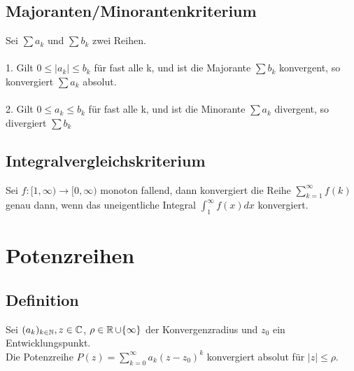 \documentclass[german]{latex4ei/latex4ei_sheet}
\begin{document}
\begin{sectionbox}
	\subsection{Majoranten/Minorantenkriterium}
	Sei $\sum a_k$  und $\sum b_k$ zwei Reihen.\\
	\\1. Gilt $0 \le |a_k| \le b_k$ für fast alle k, und ist die Majorante $\sum  b_k$ konvergent, so konvergiert $\sum  a_k$ absolut. \\
    \\2. Gilt $0 \le a_k \le b_k$ für fast alle k, und ist die Minorante $\sum  a_k$ divergent, so divergiert $\sum  b_k$


\end{sectionbox}
\begin{sectionbox}
	\subsection{Integralvergleichskriterium}

	Sei $f:[1, \infty) \rightarrow [0,\infty)$ monoton fallend, dann konvergiert die Reihe $\sum \limits_{k=1}^{\infty} f(k)$ genau dann, wenn das uneigentliche Integral $\int_{1}^{\infty}f(x)dx$ konvergiert.
\end{sectionbox}


\section{Potenzreihen}

\begin{sectionbox}
	\subsection{Definition}
	Sei $(a_k)_{k \in \operatorname{\mathbb N}},z \in \mathbb C$,  $\rho \in \operatorname{\mathbb R} \cup \{\infty\} $ der Konvergenzradius und $z_0$ ein Entwicklungspunkt.\\
	Die Potenzreihe $P(z)=\sum \limits_{k=0}^{\infty} a_k(z-z_0)^k$ konvergiert absolut für $|z| \le \rho$.
\end{sectionbox}
\end{document}
